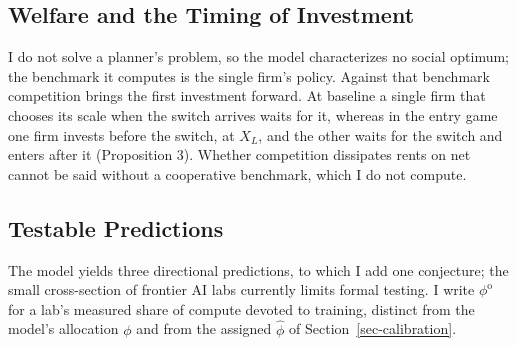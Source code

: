 \documentclass[
  11pt,
  letterpaper,
]{scrartcl}
\begin{document}
\subsection{Welfare and the Timing of
Investment}\label{welfare-and-the-timing-of-investment}

I do not solve a planner's problem, so the model characterizes no social
optimum; the benchmark it computes is the single firm's policy. Against
that benchmark competition brings the first investment forward. At
baseline a single firm that chooses its scale when the switch arrives
waits for it, whereas in the entry game one firm invests before the
switch, at \(X_L\), and the other waits for the switch and enters after
it (Proposition 3). Whether competition dissipates rents on net cannot
be said without a cooperative benchmark, which I do not compute.

\subsection{Testable Predictions}\label{testable-predictions}

The model yields three directional predictions, to which I add one
conjecture; the small cross-section of frontier AI labs currently limits
formal testing. I write \(\phi^{\mathrm{o}}\) for a lab's measured share
of compute devoted to training, distinct from the model's allocation
\(\phi\) and from the assigned \(\hat{\phi}\) of
Section~\ref{sec-calibration}.
\end{document}
